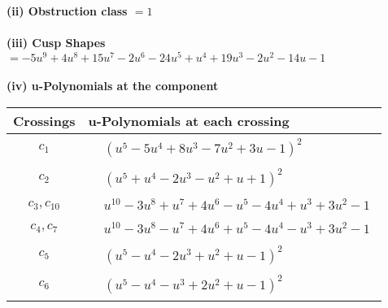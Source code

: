 \documentclass[1p]{elsarticle_modified}
\theoremstyle{definition}
\begin{document}
\flushleft \textbf{(ii) Obstruction class $= 1$}\\~\\
\flushleft \textbf{(iii) Cusp Shapes $= -5 u^9+4 u^8+15 u^7-2 u^6-24 u^5+u^4+19 u^3-2 u^2-14 u-1$}\\~\\
\newpage\renewcommand{\arraystretch}{1}
\flushleft \textbf{(iv) u-Polynomials at the component}\newline \\
\begin{tabular}{m{50pt}|m{274pt}}
Crossings & \hspace{64pt}u-Polynomials at each crossing \\
\hline $$\begin{aligned}c_{1}\end{aligned}$$&$\begin{aligned}
&(u^5-5 u^4+8 u^3-7 u^2+3 u-1)^2
\end{aligned}$\\
\hline $$\begin{aligned}c_{2}\end{aligned}$$&$\begin{aligned}
&(u^5+u^4-2 u^3- u^2+u+1)^2
\end{aligned}$\\
\hline $$\begin{aligned}c_{3},c_{10}\end{aligned}$$&$\begin{aligned}
&u^{10}-3 u^8+u^7+4 u^6- u^5-4 u^4+u^3+3 u^2-1
\end{aligned}$\\
\hline $$\begin{aligned}c_{4},c_{7}\end{aligned}$$&$\begin{aligned}
&u^{10}-3 u^8- u^7+4 u^6+u^5-4 u^4- u^3+3 u^2-1
\end{aligned}$\\
\hline $$\begin{aligned}c_{5}\end{aligned}$$&$\begin{aligned}
&(u^5- u^4-2 u^3+u^2+u-1)^2
\end{aligned}$\\
\hline $$\begin{aligned}c_{6}\end{aligned}$$&$\begin{aligned}
&(u^5- u^4- u^3+2 u^2+u-1)^2
\end{aligned}$\\

\end{tabular}
\end{document}
